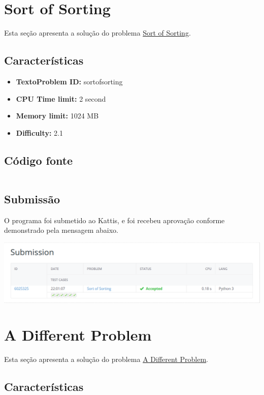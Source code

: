 \documentclass[11pt,a4paper]{scrreprt}
\begin{document}
\section{Sort of Sorting}

Esta seção apresenta a solução do problema \href{https://open.kattis.com/problems/sortofsorting}{Sort of Sorting}.

\subsection{Características}

\begin{itemize}
    \item\textbf{TextoProblem ID: } sortofsorting
    \item\textbf{CPU Time limit: } 2 second
    \item\textbf{Memory limit: } 1024 MB
    \item\textbf{Difficulty: }  2.1
\end{itemize}

\subsection{Código fonte}

\inputminted[linenos]{python}{src/SortofSorting.py}

\subsection{Submissão}
O programa foi submetido ao Kattis, e foi recebeu aprovação conforme demonstrado pela mensagem abaixo.

\includegraphics[scale=0.47]{img/SortofSorting.png}

\section{A Different Problem}

Esta seção apresenta a solução do problema \href{https://open.kattis.com/problems/different}{A Different Problem}.

\subsection{Características}
\end{document}
